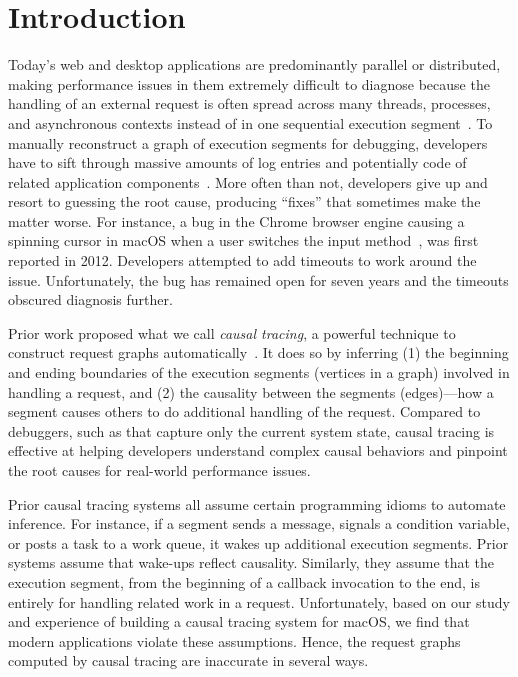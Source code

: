 \section{Introduction} \label{sec:intro}

Today's web and desktop applications are predominantly parallel or
distributed, making performance issues in them extremely difficult to
diagnose because the handling of an external request is often spread across
many threads, processes, and asynchronous contexts instead of in one
sequential execution segment~\cite{harter2012file}. To manually reconstruct
a graph of execution segments for debugging, developers have to sift
through massive amounts of log entries and potentially code of related
application components~\cite{chen2002pinpoint, zhao2016non, xu2009detecting,
nagaraj2012structured, yuan2012conservative}. More often than not, developers
give up and resort to guessing the root cause, producing ``fixes'' that
sometimes make the matter worse. For instance, a bug in the Chrome browser
engine causing a spinning cursor in macOS when a user switches the input
method~\cite{chromiumbugreport}, was first reported in 2012. Developers
attempted to add timeouts to work around the issue. Unfortunately, the bug has
remained open for seven years and the timeouts obscured diagnosis further.

Prior work proposed what we call \emph{causal tracing}, a powerful technique
to construct request graphs automatically~\cite{reynolds2006pip, fonseca2007x,
benjamin2010dapper, zhang2013panappticon, ravindranath2012appinsight}. It
does so by inferring (1) the beginning and ending boundaries of the execution
segments (vertices in a graph) involved in handling a request, and (2) the
causality between the segments (edges)---how a segment causes others to do
additional handling of the request. Compared to debuggers, such as \spindump that
capture only the current system state, causal tracing is effective at helping
developers understand complex causal behaviors and pinpoint the root causes
for real-world performance issues.

Prior causal tracing systems all assume certain programming idioms to automate
inference. For instance, if a segment sends a message, signals a condition
variable, or posts a task to a work queue, it wakes up additional execution
segments. Prior systems assume that wake-ups reflect causality. Similarly, they
assume that the execution segment, from the beginning of a callback invocation
to the end, is entirely for handling related work in a request. Unfortunately,
based on our study and experience of building a causal tracing system for macOS,
we find that modern applications violate these assumptions. Hence, the request
graphs computed by causal tracing are inaccurate in several ways.

